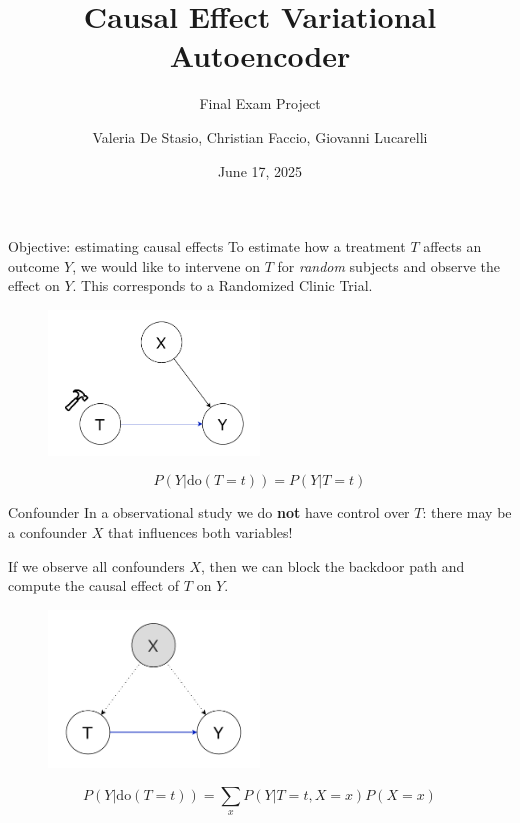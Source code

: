 \documentclass[10pt]{beamer}
\title{Causal Effect Variational Autoencoder}
\subtitle{Final Exam Project}
\date{June 17, 2025}
\author[longname]{Valeria De Stasio, Christian Faccio, Giovanni Lucarelli}
\begin{document}
\maketitle


\begin{frame}{Objective: estimating causal effects}
  To estimate how a treatment $T$ affects an outcome $Y$, we would like to intervene on $T$ for \textit{random} subjects and observe the effect on $Y$. This corresponds to a Randomized Clinic Trial.
  \begin{figure}
    \centering
    \includegraphics[width=0.5\textwidth]{images/intervention.drawio.pdf}
  \end{figure}
  \begin{equation*}
    P(Y|\text{do}(T=t))=P(Y|T=t)
  \end{equation*}
\end{frame}

\begin{frame}{Confounder}
  In a observational study we do \textbf{not} have control over 
  $T$: there may be a confounder $X$ that influences both variables!
  
  If we observe all confounders $X$, then we can block the backdoor path and compute the causal effect of $T$ on $Y$.
  \begin{figure}
    \centering
    \includegraphics[width=0.5\textwidth]{images/backdoor.drawio.pdf}
  \end{figure}
  \begin{equation*}
    P(Y|\text{do}(T=t)) = \sum_{x} P(Y|T=t, X=x) P(X=x)
  \end{equation*}
\end{frame}
\end{document}
